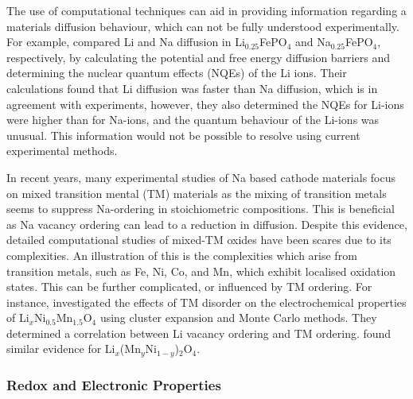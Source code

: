 \documentclass[../main.tex]{subfiles}
\begin{document}
The use of computational techniques can aid in providing information regarding a materials diffusion behaviour, which can not be fully understood experimentally. For example, \citeauthor{dixit2015classical} compared Li and Na diffusion in Li$_{0.25}$FePO$_4$ and Na$_{0.25}$FePO$_4$, respectively, by calculating the potential and free energy diffusion barriers and determining the nuclear quantum effects (NQEs) of the Li ions. \cite{dixit2015classical} Their calculations found that Li diffusion was faster than Na diffusion, which is in agreement with experiments, however, they also determined the NQEs for Li-ions were higher than for Na-ions, and the quantum behaviour of the Li-ions was unusual. This information would not be possible to resolve using current experimental methods.

In recent years, many experimental studies of Na based cathode materials focus on mixed transition mental (TM) materials as the mixing of transition metals seems to suppress Na-ordering in stoichiometric compositions. \cite{komaba2011electrochemical, yabuuchi2012p2} This is beneficial as Na vacancy ordering can lead to a reduction in diffusion. \cite{VanderVen2001} Despite this evidence, detailed computational studies of mixed-TM oxides have been scares due to its complexities. An illustration of this is the complexities which arise from transition metals, such as Fe, Ni, Co, and Mn, which exhibit localised oxidation states. This can be further complicated, or influenced by TM ordering. For instance, \citeauthor{lee2013solid} investigated the effects of TM disorder on the electrochemical properties of Li$_x$Ni$_{0.5}$Mn$_{1.5}$O$_4$ using cluster expansion and Monte Carlo methods. They determined a correlation between Li vacancy ordering and TM ordering. \cite{lee2013solid} \citeauthor{hao2016quaternary} found similar evidence for Li$_x$(Mn$_y$Ni$_{1-y}$)$_2$O$_4$. \cite{hao2016quaternary}

\subsubsection{Redox and Electronic Properties}
\end{document}
